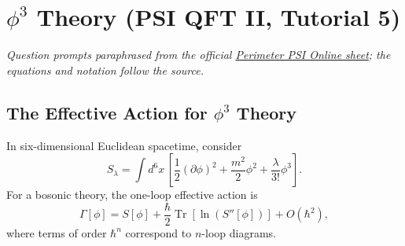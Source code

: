 \section{$\phi^3$ Theory (PSI QFT II, Tutorial 5)}

\noindent\textit{Question prompts paraphrased from the official
\href{https://psi-online.perimeterinstitute.ca/courses/take/quantum-field-theory-ii-student/pdfs/20776383-module-4-tutorial-2}{Perimeter PSI Online sheet};
the equations and notation follow the source.}

\subsection{The Effective Action for $\phi^3$ Theory}

In six-dimensional Euclidean spacetime, consider
\begin{equation}
    S_\lambda
    =\int d^6x\,
    \left[
        \frac{1}{2}(\partial\phi)^2
        +\frac{m^2}{2}\phi^2
        +\frac{\lambda}{3!}\phi^3
    \right].
\end{equation}
For a bosonic theory, the one-loop effective action is
\begin{equation}
    \Gamma[\phi]
    =S[\phi]
    +\frac{\hbar}{2}\operatorname{Tr}
    \!\left[\ln\!\left(S''[\phi]\right)\right]
    +O(\hbar^2),
\end{equation}
where terms of order $\hbar^n$ correspond to $n$-loop diagrams.

